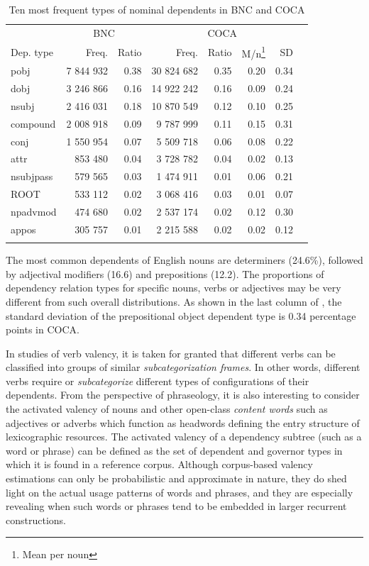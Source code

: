 \documentclass[output=paper]{langscibook}
\begin{document}
\begin{table}
\begin{tabular}{l rrr  rrrr}
\lsptoprule
& \multicolumn{2}{c}{BNC} & \multicolumn{4}{c}{COCA}\\\cmidrule(lr){2-3}\cmidrule(lr){4-7}
Dep. type & Freq. & Ratio & Freq. & Ratio & M/n\footnote{Mean per noun} & SD\\\midrule
pobj      &  7 844 932 &  0.38 & 30 824 682 &  0.35 &  0.20 &  0.34\\
dobj      &  3 246 866 &  0.16 & 14 922 242 &  0.16 &  0.09 &  0.24\\
nsubj     &  2 416 031 &  0.18 & 10 870 549 &  0.12 &  0.10 &  0.25\\
compound  &  2 008 918 &  0.09 & 9 787 999  &  0.11 &  0.15 &  0.31\\
conj      &  1 550 954 &  0.07 & 5 509 718  &  0.06 &  0.08 &  0.22\\
attr      &  853 480   &  0.04 & 3 728 782  &  0.04 &  0.02 &  0.13\\
nsubjpass &  579 565   &  0.03 & 1 474 911  &  0.01 &  0.06 &  0.21\\ 
ROOT      &  533 112   &  0.02 & 3 068 416  &  0.03 &  0.01 &  0.07\\
npadvmod  &  474 680   &  0.02 & 2 537 174  &  0.02 &  0.12 &  0.30\\
appos     &  305 757   &  0.01 & 2 215 588  &  0.02 &  0.02 &  0.12\\ 
\lspbottomrule
\end{tabular}
\caption{\label{tab:pezik:5}Ten most frequent types of nominal dependents in BNC and COCA}
\end{table}

The most common dependents of English nouns are determiners (24.6\%), followed by adjectival modifiers (16.6) and prepositions (12.2). The proportions of dependency relation types for specific nouns, verbs or adjectives may be very different from such overall distributions. As shown in the last column of , the standard deviation of the prepositional object dependent type is 0.34 percentage points in COCA. 

In studies of verb valency, it is taken for granted that different verbs can be classified into groups of similar \textit{subcategorization frames}. In other words, different verbs require or \textit{subcategorize} different types of configurations of their dependents. From the perspective of phraseology, it is also interesting to consider the activated valency of nouns and other open-class \textit{content words} such as adjectives or adverbs which function as headwords defining the entry structure of lexicographic resources. The activated valency of a dependency subtree (such as a word or phrase) can be defined as the set of dependent and governor types in which it is found in a reference corpus. Although corpus-based valency estimations can only be probabilistic and approximate in nature, they do shed light on the actual usage patterns of words and phrases, and they are especially revealing when such words or phrases tend to be embedded in larger recurrent constructions.
\end{document}
